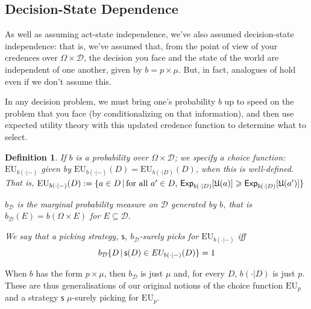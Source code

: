 \documentclass[a4paper]{article}
\newtheorem{definition}{Definition}
\newcommand\Exp{\mathsf{Exp}}
\newcommand\EU{\mathrm{EU}}
\newcommand\U{\mathfrak{U}} %
\newcommand{\D}{\mathcal{D}}
\newcommand{\Decs}{\mathcal{D}}
\renewcommand\S{\mathcal{S}}
\newcommand\s{\mathsf{s}}
\newcommand\SetDelimiter[1][]{
	\nonscript\,#1\vert \allowbreak \nonscript\,\mathopen{}}
\providecommand\given{\SetDelimiter}
\renewcommand{\geq}{\geqslant}
\newenvironment{CCM rewritten}
{\begingroup\color{blue}} %
{\endgroup}              %
\begin{document}
\subsection{Decision-State Dependence}\label{sect:decdep}

As well as assuming act-state independence, we've also assumed decision-state independence: that is, we've assumed that, from the point of view of your credences over $\Omega \times \D$, the decision you face and the state of the world are independent of one another, given by $b=p\times\mu$. But, in fact, analogues of  hold even if we don't assume this. 

In any decision problem, we must bring one's probability $b$ up to speed on the problem that you face (by conditionalizing on that information), and then use expected utility theory with this updated credence function to determine what to select. 

\begin{definition}\label{def:cond}
	If $b$ is a probability over $\Omega\times \D$; we specify a choice function: 
	$\EU_{b(\cdot|-)}$ given by $\EU_{b(\cdot|-)}(D)=\EU_{b(\cdot|D)}(D)$, when this is well-defined.
	That is, $\EU_{b(\cdot|-)}(D):=\{a\in D\given \text{for all $a'\in D$, }\Exp_{b(\cdot|D)}[\U(a)]\geq \Exp_{b(\cdot|D)}[\U(a')]\}$

$b_\Decs$ is the marginal probability measure on $\Decs$ generated by $b$, that is $b_\D(E)=b(\Omega\times E)$ for $E\subseteq\Decs$.

We say that %
a picking strategy, $\s$, \emph{$b_\Decs$-surely picks for $\EU_{b(\cdot|-)}$} iff \[b_\Decs\{D\given \s(D)\in EU_{b(\cdot|-)}(D)\}=1\]
\end{definition}
When $b$ has the form $p\times\mu$, then $b_\Decs$ is just $\mu$ and, for every $D$, $b(\cdot|D)$ is just $p$. These are thus generalisations of our original notions of the choice function $\EU_p$ and a strategy $\s$ $\mu$-surely picking for $\EU_p$. 
\end{document}
